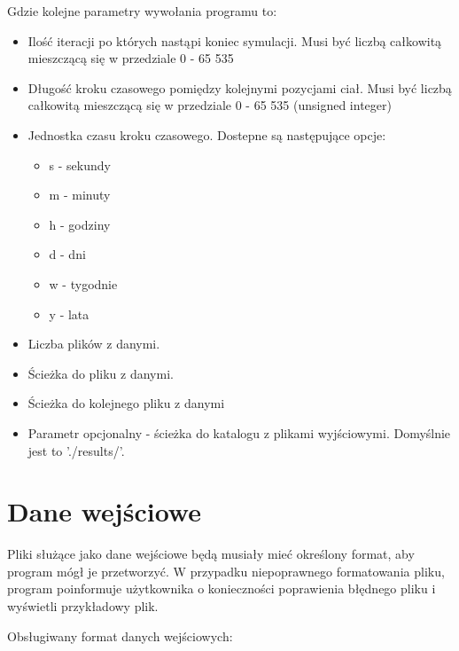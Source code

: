 \documentclass[a4paper,11pt,notitlepage]{article}
\begin{document}
Gdzie kolejne parametry wywołania programu to:
\begin{itemize}[noitemsep]
	\item Ilość iteracji po których nastąpi koniec symulacji. Musi być liczbą całkowitą mieszczącą się w przedziale 0 - 65 535 
	\item Długość kroku czasowego pomiędzy kolejnymi pozycjami ciał. Musi być liczbą całkowitą mieszczącą się w przedziale 0 - 65 535 (unsigned integer)
 	\item Jednostka czasu kroku czasowego. Dostepne są następujące opcje:
	\begin{itemize}[noitemsep]
		\item s - sekundy
		\item m - minuty
		\item h - godziny
		\item d - dni
		\item w - tygodnie
		\item y - lata
	\end{itemize}
	\item Liczba plików z danymi. 
	\item Ścieżka do pliku z danymi.
	\item Ścieżka do kolejnego pliku z danymi
	\item Parametr opcjonalny - ścieżka do katalogu z plikami wyjściowymi. Domyślnie jest to './results/'.
\end{itemize}

\section{Dane wejściowe}
Pliki służące jako dane wejściowe będą musiały mieć określony format, aby program mógł je przetworzyć. W przypadku niepoprawnego formatowania pliku, program poinformuje użytkownika o konieczności poprawienia błędnego pliku i wyświetli przykładowy plik.

\vspace{0.1in}
Obsługiwany format danych wejściowych:

\vspace{0.1in}
\end{document}
